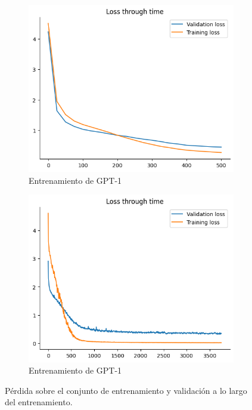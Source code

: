 \begin{figure}[tb]
    \centering
    \begin{subfigure}[b]{0.49\textwidth}
        \centering
        \includegraphics[width=\textwidth]{figures/chapter5/loss.png}
        \caption{Entrenamiento de GPT-1}
        \label{fig:loss}
    \end{subfigure}
    \begin{subfigure}[b]{0.49\textwidth}
        \centering
        \includegraphics[width=\textwidth]{figures/chapter5/loss_big.png}
        \caption{Entrenamiento de GPT-1}
        \label{fig:loss_big}
    \end{subfigure}
    \caption{Pérdida sobre el conjunto de entrenamiento y validación a lo largo del entrenamiento.}
\end{figure}
